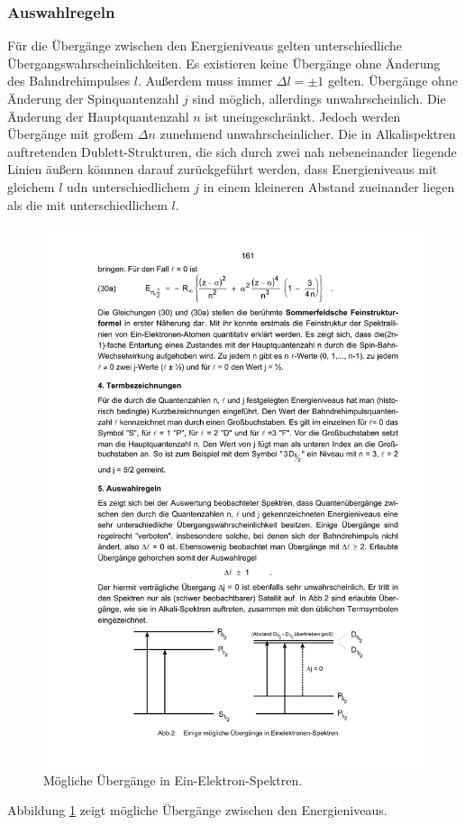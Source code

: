 \subsubsection{Auswahlregeln}
Für die Übergänge zwischen den Energieniveaus gelten unterschiedliche Übergangswahrscheinlichkeiten. Es existieren keine Übergänge ohne Änderung des Bahndrehimpulses $l$. Außerdem muss immer $\Delta l = \pm 1$ gelten. Übergänge ohne Änderung der Spinquantenzahl $j$ sind möglich, allerdings unwahrscheinlich. Die Änderung der Hauptquantenzahl $n$  ist uneingeschränkt. Jedoch werden Übergänge mit großem $\Delta n$ zunehmend unwahrscheinlicher.
Die in Alkalispektren auftretenden Dublett-Strukturen, die sich durch zwei nah nebeneinander liegende Linien äußern könnnen darauf zurückgeführt werden, dass Energieniveaus mit gleichem $l$ udn unterschiedlichem $j$ in einem kleineren Abstand zueinander liegen als die mit unterschiedlichem $l$.

\begin{figure}
  \centering
  \includegraphics[scale=0.8]{content/übergänge.pdf}
\caption{Mögliche Übergänge in Ein-Elektron-Spektren\cite{anleitung605}.}
  \label{fig:übergänge}
\end{figure}
Abbildung \ref{fig:übergänge} zeigt mögliche Übergänge zwischen den Energieniveaus.

